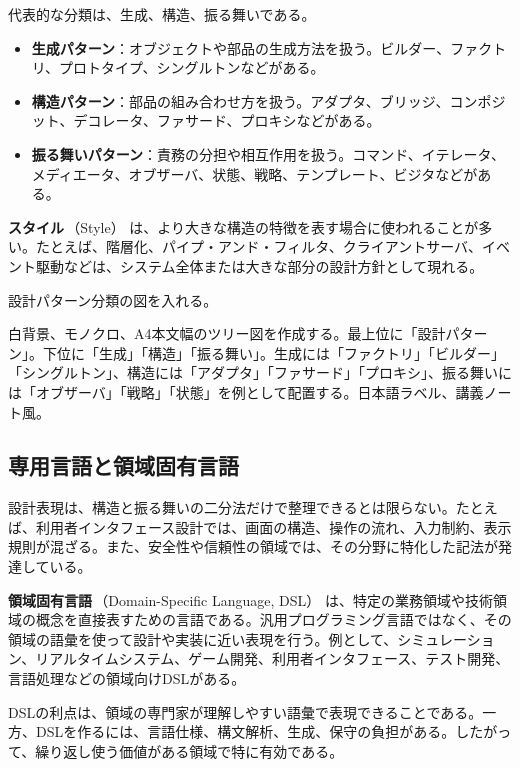 \documentclass[10.5pt,a4paper]{ltjsarticle}
\newcommand{\term}[2]{\textbf{#1}\,（#2）}
\begin{document}
代表的な分類は、生成、構造、振る舞いである。
\begin{itemize}
  \item \textbf{生成パターン}：オブジェクトや部品の生成方法を扱う。ビルダー、ファクトリ、プロトタイプ、シングルトンなどがある。
  \item \textbf{構造パターン}：部品の組み合わせ方を扱う。アダプタ、ブリッジ、コンポジット、デコレータ、ファサード、プロキシなどがある。
  \item \textbf{振る舞いパターン}：責務の分担や相互作用を扱う。コマンド、イテレータ、メディエータ、オブザーバ、状態、戦略、テンプレート、ビジタなどがある。
\end{itemize}

\term{スタイル}{Style} は、より大きな構造の特徴を表す場合に使われることが多い。たとえば、階層化、パイプ・アンド・フィルタ、クライアントサーバ、イベント駆動などは、システム全体または大きな部分の設計方針として現れる。

\begin{todobox}
設計パターン分類の図を入れる。
\end{todobox}
\begin{promptbox}
白背景、モノクロ、A4本文幅のツリー図を作成する。最上位に「設計パターン」。下位に「生成」「構造」「振る舞い」。生成には「ファクトリ」「ビルダー」「シングルトン」、構造には「アダプタ」「ファサード」「プロキシ」、振る舞いには「オブザーバ」「戦略」「状態」を例として配置する。日本語ラベル、講義ノート風。
\end{promptbox}

\subsection{専用言語と領域固有言語}

設計表現は、構造と振る舞いの二分法だけで整理できるとは限らない。たとえば、利用者インタフェース設計では、画面の構造、操作の流れ、入力制約、表示規則が混ざる。また、安全性や信頼性の領域では、その分野に特化した記法が発達している。

\term{領域固有言語}{Domain-Specific Language, DSL} は、特定の業務領域や技術領域の概念を直接表すための言語である。汎用プログラミング言語ではなく、その領域の語彙を使って設計や実装に近い表現を行う。例として、シミュレーション、リアルタイムシステム、ゲーム開発、利用者インタフェース、テスト開発、言語処理などの領域向けDSLがある。

DSLの利点は、領域の専門家が理解しやすい語彙で表現できることである。一方、DSLを作るには、言語仕様、構文解析、生成、保守の負担がある。したがって、繰り返し使う価値がある領域で特に有効である。
\end{document}
